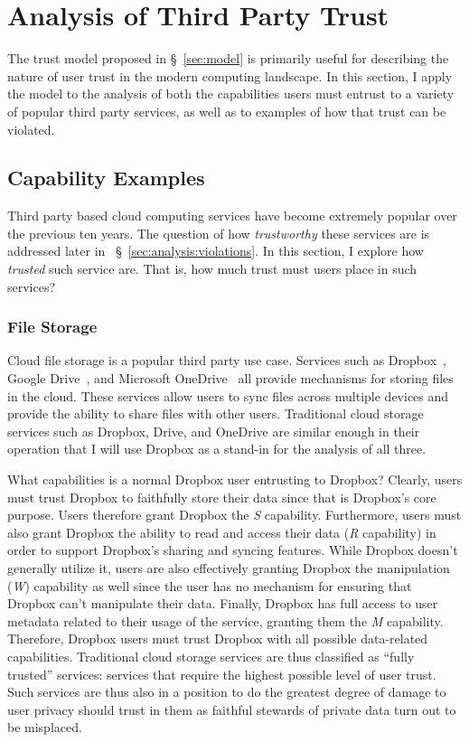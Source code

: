 \section{Analysis of Third Party Trust}
\label{sec:analysis}

The trust model proposed in \S~\ref{sec:model} is primarily useful for
describing the nature of user trust in the modern computing
landscape. In this section, I apply the model to the analysis of both
the capabilities users must entrust to a variety of popular third
party services, as well as to examples of how that trust can be
violated.

\subsection{Capability Examples}
\label{sec:analysis:capabilities}

Third party based cloud computing services have become extremely
popular over the previous ten years.  The question of how
\textit{trustworthy} these services are is addressed later in
~\S~\ref{sec:analysis:violations}. In this section, I explore how
\textit{trusted} such service are. That is, how much trust must users
place in such services?

\subsubsection{File Storage}

Cloud file storage is a popular third party use case. Services such as
Dropbox~\cite{dropbox}, Google Drive~\cite{google-drive}, and
Microsoft OneDrive~\cite{microsoft-onedrive} all provide mechanisms
for storing files in the cloud. These services allow users to sync
files across multiple devices and provide the ability to share files
with other users. Traditional cloud storage services such as Dropbox,
Drive, and OneDrive are similar enough in their operation that I will
use Dropbox as a stand-in for the analysis of all three.

What capabilities is a normal Dropbox user entrusting to Dropbox?
Clearly, users must trust Dropbox to faithfully store their data since
that is Dropbox's core purpose. Users therefore grant Dropbox the
\emph{S} capability. Furthermore, users must also grant Dropbox the
ability to read and access their data (\emph{R} capability) in order
to support Dropbox's sharing and syncing features. While Dropbox
doesn't generally utilize it, users are also effectively granting
Dropbox the manipulation (\emph{W}) capability as well since the user
has no mechanism for ensuring that Dropbox can't manipulate their
data. Finally, Dropbox has full access to user metadata related to
their usage of the service, granting them the \emph{M}
capability. Therefore, Dropbox users must trust Dropbox with all
possible data-related capabilities. Traditional cloud storage services
are thus classified as ``fully trusted'' services: services that
require the highest possible level of user trust. Such services are
thus also in a position to do the greatest degree of damage to user
privacy should trust in them as faithful stewards of private data turn
out to be misplaced.

